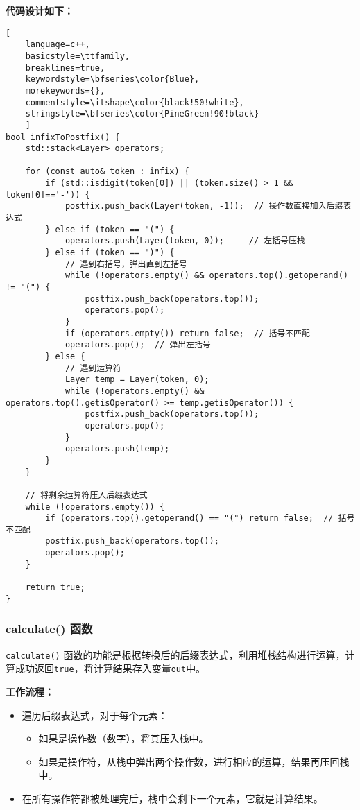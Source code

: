 \documentclass[UTF8]{ctexart}
\begin{document}
\textbf{代码设计如下：}
\begin{lstlisting}[ 
    language=c++,
    basicstyle=\ttfamily,
    breaklines=true,
    keywordstyle=\bfseries\color{Blue}, 
    morekeywords={}, 
    commentstyle=\itshape\color{black!50!white},
    stringstyle=\bfseries\color{PineGreen!90!black} 
    ]
bool infixToPostfix() {
    std::stack<Layer> operators;

    for (const auto& token : infix) {
        if (std::isdigit(token[0]) || (token.size() > 1 && token[0]=='-')) {
            postfix.push_back(Layer(token, -1));  // 操作数直接加入后缀表达式
        } else if (token == "(") {
            operators.push(Layer(token, 0));     // 左括号压栈
        } else if (token == ")") {
            // 遇到右括号，弹出直到左括号
            while (!operators.empty() && operators.top().getoperand() != "(") {
                postfix.push_back(operators.top());
                operators.pop();
            }
            if (operators.empty()) return false;  // 括号不匹配
            operators.pop();  // 弹出左括号
        } else {
            // 遇到运算符
            Layer temp = Layer(token, 0);
            while (!operators.empty() && operators.top().getisOperator() >= temp.getisOperator()) {
                postfix.push_back(operators.top());
                operators.pop();
            }
            operators.push(temp);
        }
    }

    // 将剩余运算符压入后缀表达式
    while (!operators.empty()) {
        if (operators.top().getoperand() == "(") return false;  // 括号不匹配
        postfix.push_back(operators.top());
        operators.pop();
    }

    return true;
}
\end{lstlisting}

\subsubsection{calculate() 函数}

\texttt{calculate()} 函数的功能是根据转换后的后缀表达式，利用堆栈结构进行运算，计算成功返回\texttt{true}，将计算结果存入变量\texttt{out}中。

\textbf{工作流程：}
\begin{itemize}
    \item 遍历后缀表达式，对于每个元素：
    \begin{itemize}
        \item 如果是操作数（数字），将其压入栈中。
        \item 如果是操作符，从栈中弹出两个操作数，进行相应的运算，结果再压回栈中。
    \end{itemize}
    \item 在所有操作符都被处理完后，栈中会剩下一个元素，它就是计算结果。
    
\end{itemize}
\end{document}
